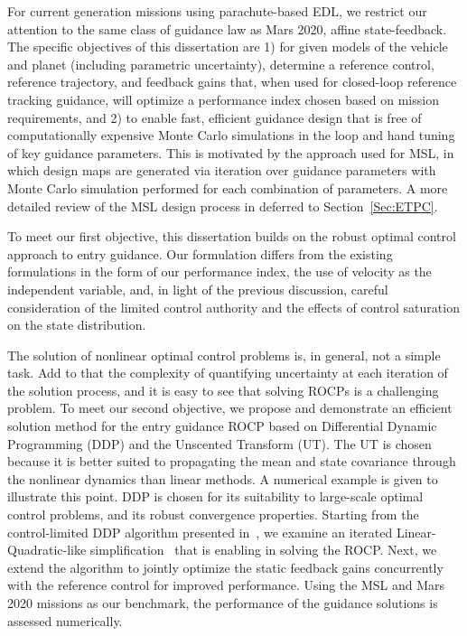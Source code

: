 For current generation missions using parachute-based EDL, we restrict our attention to the same class of guidance law as Mars 2020, affine state-feedback.
The specific objectives of this dissertation are 1) for given models of the vehicle and planet (including parametric uncertainty), determine a reference control, reference trajectory, and feedback gains that, when used for closed-loop reference tracking guidance, will optimize a performance index chosen based on mission requirements, and 2) to enable fast, efficient guidance design that is free of computationally expensive Monte Carlo simulations in the loop and hand tuning of key guidance parameters. This is motivated by the approach used for MSL, in which design maps are generated via iteration over guidance parameters with Monte Carlo simulation performed for each combination of parameters. A more detailed review of the MSL design process in deferred to Section~\ref{Sec:ETPC}.

To meet our first objective, this dissertation builds on the robust optimal control approach to entry guidance.
Our formulation differs from the existing formulations in the form of our performance index, the use of velocity as the independent variable, and, in light of the previous discussion, careful consideration of the limited control authority and the effects of control saturation on the state distribution.

The solution of nonlinear optimal control problems is, in general, not a simple task. Add to that the complexity of quantifying uncertainty at each iteration of the solution process, and it is easy to see that solving ROCPs is a challenging problem. To meet our second objective, we propose and demonstrate an efficient solution method for the entry guidance ROCP based on Differential Dynamic Programming (DDP) and the Unscented Transform (UT). The UT is chosen because it is better suited to propagating the mean and state covariance through the nonlinear dynamics than linear methods. A numerical example is given to illustrate this point. DDP is chosen for its suitability to large-scale optimal control problems, and its robust convergence properties. Starting from the control-limited DDP algorithm presented in~\cite{DDP_ControlLimited}, we examine an iterated Linear-Quadratic-like simplification~\cite{iLQG} that is enabling in solving the ROCP. Next, we extend the algorithm to jointly optimize the static feedback gains concurrently with the reference control for improved performance. Using the MSL and Mars 2020 missions as our benchmark, the performance of the guidance solutions is assessed numerically. 



